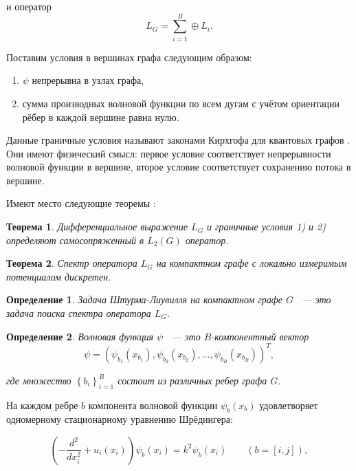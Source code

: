 \documentclass[a4 paper, 12 pt]{extarticle}
\newtheorem{theorem}{Теорема}[section]
\newtheorem{Def}{Определение}[section]
\begin{document}
  и оператор
  \begin{equation}\label{LG}
  L_G=\sum_{i=1}^{B}\oplus L_i.
  \end{equation}

  Поставим условия в вершинах графа следующим образом:

  \begin{enumerate}\label{Kirchoff}
	\item $\psi$ непрерывна в узлах графа,
	\item сумма производных волновой функции по всем дугам с учётом ориентации рёбер в каждой вершине равна нулю.
  \end{enumerate}

  Данные граничные условия называют законами Кирхгофа для квантовых графов \cite{KirchhoffRule}. Они имеют физический смысл: первое условие соответствует непрерывности волновой функции в вершине, второе условие соответствует сохранению потока в вершине.

Имеют место следующие теоремы \cite{GerasimenkoPavlov}:

   \begin{theorem}
	Дифференциальное выражение $L_G$ и граничные условия 1) и 2)
	определяют самосопряженный в $L_2(G)$ оператор.
   \end{theorem}

  \begin{theorem}
	Спектр оператора $L_{G}$ на компактном графе с локально измеримым
	потенциалом дискретен.
  \end{theorem}

  \begin{Def}
  	Задача Штурма-Лиувилля на компактном графе $G$ ~--- это задача поиска спектра оператора $L_{G}$.
  \end{Def}

  \begin{Def}
  	Волновая функция $\psi$ ~--- это $B$-компонентный вектор $$\psi=\left(\psi_{b_1}(x_{b_1}),
  	\psi_{b_2}(x_{b_2}),\ldots,\psi_{b_B}(x_{b_B})\right)^T,$$
  	
  	где множество $\left\{b_i\right\}_{i=1}^{B}$ состоит из различных
  	ребер графа $G$.
  \end{Def}

  На каждом ребре $b$ компонента волновой функции $\psi_b(x_b)$
  удовлетворяет одномерному стационарному уравнению Шрёдингера:

  \begin{equation}\label{Shred1}
   \left(-\frac{d^2}{dx_i^2} +
    u_i(x_i)\right)\psi_b(x_{i})=k^2\psi_b(x_{i})\qquad(b=[i,j]),
  \end{equation}
\end{document}
